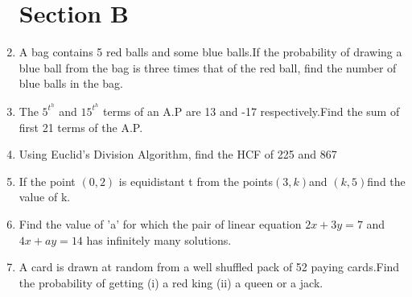 \documentclass[journal,12pt,twocolumn]{IEEEtran}
\renewcommand\thesection{\arabic{section}}
\begin{document}
\begin{enumerate}[label=\thesection.\arabic*.,ref=\thesection.\theenumi]
\section{Section B}
 \item A bag contains 5 red balls and some blue balls.If the probability of drawing a blue ball from the bag is three times that of the red ball, find the number of blue balls in the bag.\\
 \newline
\item The $5^t^h$ and $15^t^h$ terms of an A.P are 13 and -17 respectively.Find the sum of first 21 terms of the A.P.\\
\newline
\item Using Euclid's Division Algorithm, find the HCF of 225 and 867\\
\newline
\item If the point $(0,2)$ is equidistant
t from the points$(3,k)$and $(k,5)$find the value of k.\\
\newline
\item Find the value of 'a' for which the pair of linear equation $2x+3y=7$ and $4x+ay=14$ has infinitely many solutions.\\
\newline
\item A card is drawn at random from a well shuffled pack of 52 paying cards.Find the probability of getting (i) a red king (ii) a queen or a jack.\\
\newline

\end{enumerate}
\end{document}
